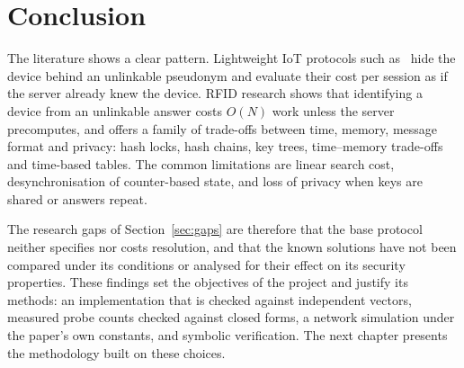 \section{Conclusion}
The literature shows a clear pattern. Lightweight IoT protocols such as~\cite{base} hide the device behind an unlinkable pseudonym and evaluate their cost per session as if the server already knew the device. RFID research shows that identifying a device from an unlinkable answer costs $O(N)$ work unless the server precomputes, and offers a family of trade-offs between time, memory, message format and privacy: hash locks, hash chains, key trees, time--memory trade-offs and time-based tables. The common limitations are linear search cost, desynchronisation of counter-based state, and loss of privacy when keys are shared or answers repeat.

The research gaps of Section~\ref{sec:gaps} are therefore that the base protocol neither specifies nor costs resolution, and that the known solutions have not been compared under its conditions or analysed for their effect on its security properties. These findings set the objectives of the project and justify its methods: an implementation that is checked against independent vectors, measured probe counts checked against closed forms, a network simulation under the paper's own constants, and symbolic verification. The next chapter presents the methodology built on these choices.
